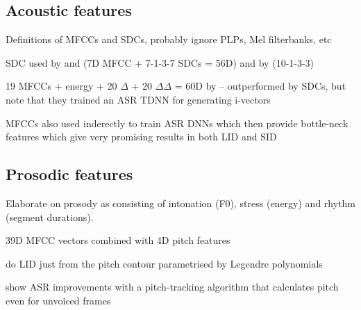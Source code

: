 \documentclass[bsc,frontabs,twoside,singlespacing,parskip,deptreport]{infthesis}
\begin{document}
{{    \subsection{Acoustic features}{
      \label{sec:acoustic-feats}
      Definitions of MFCCs and SDCs, probably ignore PLPs, Mel filterbanks, etc

      SDC used by \cite{Ferrer_et_al_2016} and \cite{Sarma_et_al_2018} (7D MFCC + 7-1-3-7 SDCs = 56D) and by \cite{Torres-Carrasquillo_et_al_2002} (10-1-3-3)

      19 MFCCs + energy + 20 $\Delta$ + 20 $\Delta\Delta$ = 60D by \cite{Sarma_et_al_2018} -- outperformed by SDCs, but note that they trained an ASR TDNN for generating i-vectors
      
      MFCCs also used inderectly to train ASR DNNs which then provide bottle-neck features which give very promising results in both LID and SID
    }
    \subsection{Prosodic features}{
      Elaborate on prosody as consisting of intonation (F0), stress (energy) and rhythm (segment durations).
      
      39D MFCC vectors combined with 4D pitch features \citep{Song_et_al_2013}

      \cite{Lin_et_al_2005} do LID just from the pitch contour parametrised by Legendre polynomials

      \cite{Ghahremani_et_al_2014} show ASR improvements with a pitch-tracking algorithm that calculates pitch even for unvoiced frames
    }
  }
}
\end{document}
